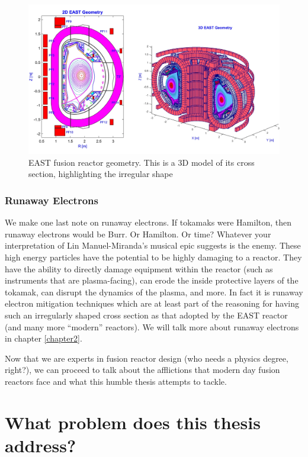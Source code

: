 \begin{figure}[h!]
    \centering
    \includegraphics[scale=0.2]{imgs/c1/east-cross-section.png}
    \caption{EAST fusion reactor geometry. This is a 3D model of its cross section, highlighting the irregular shape \cite{east-geometry-article}}
    \label{fig:east-geometry}
\end{figure}

\subsubsection{Runaway Electrons}
We make one last note on runaway electrons. If tokamaks were Hamilton, then runaway electrons would be Burr. Or Hamilton. Or time? 
Whatever your interpretation of Lin Manuel-Miranda's musical epic suggests is the enemy. These high energy particles have the 
potential to be highly damaging to a reactor. They have the ability to directly damage equipment within the reactor (such 
as instruments that are plasma-facing), can erode the inside protective layers of the tokamak, can 
disrupt the dynamics of the plasma, and more. In fact it is runaway electron mitigation 
techniques which are at least part of the reasoning for having such an irregularly shaped 
cross section as that adopted by the EAST reactor (and many more ``modern'' reactors). We will talk more about runaway electrons in chapter \ref{chapter2}.

Now that we are experts in fusion reactor design (who needs a physics degree, right?), we can proceed to talk about the 
afflictions that modern day fusion reactors face and what this humble thesis attempts to tackle.

\section{What problem does this thesis address?}

